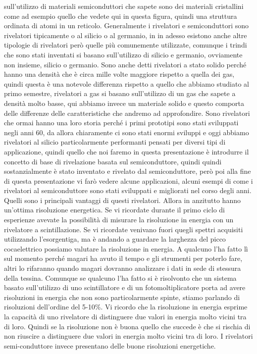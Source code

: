 sull'utilizzo di materiali semiconduttori che sapete sono dei materiali cristallini come ad esempio quello che vedete qui in questa figura, quindi una struttura ordinata di atomi in un reticolo. Generalmente i rivelatori e semiconduttori sono rivelatori tipicamente o al silicio o al germanio, in in adesso esistono anche altre tipologie di rivelatori però quelle più comunemente utilizzate, comunque i trindi che sono stati inventati si basano sull'utilizzo di silicio e germanio, ovviamente non insieme, silicio o germanio. Sono anche detti rivelatori a stato solido perché hanno una densità che è circa mille volte maggiore rispetto a quella dei gas, quindi questa è una notevole differenza rispetto a quello che abbiamo studiato al primo semestre, rivelatori a gas si basano sull'utilizzo di un gas che sapete a densità molto basse, qui abbiamo invece un materiale solido e questo comporta delle differenze delle caratteristiche che andremo ad approfondire. Sono rivelatori che ormai hanno una loro storia perché i primi prototipi sono stati sviluppati negli anni 60, da allora chiaramente ci sono stati enormi sviluppi e oggi abbiamo rivelatori al silicio particolarmente performanti pensati per diversi tipi di applicazione, quindi quello che noi faremo in questa presentazione è introdurre il concetto di base di rivelazione basata sul semiconduttore, quindi quindi sostanzialmente è stato inventato e rivelato dal semiconduttore, però poi alla fine di questa presentazione vi farò vedere alcune applicazioni, alcuni esempi di come i rivelatori al semiconduttore sono stati sviluppati e migliorati nel corso degli anni. Quelli sono i principali vantaggi di questi rivelatori. Allora in anzitutto hanno un'ottima risoluzione energetica. Se vi ricordate durante il primo ciclo di esperienze avevate la possibilità di misurare la risoluzione in energia con un rivelatore a scintillazione. Se vi ricordate venivano fuori quegli spettri acquisiti utilizzando l'esorgentiga, ma è andando a guardare la larghezza del picco cocaelettrico possiamo valutare la risoluzione in energia. A qualcuno l'ha fatto lì sul momento perché magari ha avuto il tempo e gli strumenti per poterlo fare, altri lo rifaranno quando magari dovranno analizzare i dati in sede di stessura della tessina. Comunque se qualcuno l'ha fatto si è risolvonto che un sistema basato sull'utilizzo di uno scintillatore e di un fotomoltiplicatore porta ad avere risoluzioni in energia che non sono particolarmente spinte, stiamo parlando di risoluzioni dell'ordine del 5-10\%. Vi ricordo che la risoluzione in energia esprime la capacità di uno rivelatore di distinguere due valori in energia molto vicini tra di loro. Quindi se la risoluzione non è buona quello che succede è che si rischia di non riuscire a distinguere due valori in energia molto vicini tra di loro. I rivelatori semi-conduttore invece presentano delle buone risoluzioni energetiche.

